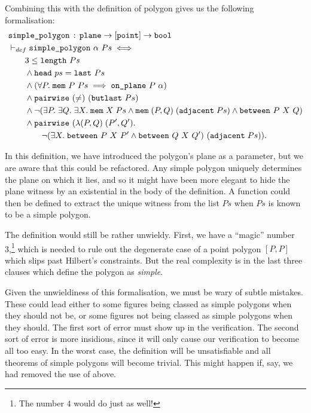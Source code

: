 Combining this with the definition of polygon gives us the following formalisation:
\begin{equation}\label{eq:SimplePolygonDef}
  \begin{split}
  &\texttt{simple\_polygon}\,:\,\texttt{plane} \rightarrow [\texttt{point}] \rightarrow \texttt{bool}\\
  &\vdash_{def}\texttt{simple\_polygon}\ \alpha\ Ps \iff \\
  &\qquad 3 \leq \texttt{length}\ Ps\\
  &\qquad\wedge \texttt{head}\ ps = \texttt{last}\ Ps\\
  &\qquad\wedge (\forall P.\;\texttt{mem}\ P\ Ps \implies \texttt{on\_plane}\ P\ \alpha)\\
  &\qquad\wedge \texttt{pairwise}\ (\neq)\ (\texttt{butlast}\ Ps)\\
  &\qquad\wedge \neg(\exists P.\;\exists Q.\;\exists X.\; \texttt{mem}\;X\;Ps\wedge\texttt{mem}\;(P,Q)\;(\texttt{adjacent}\;Ps)\wedge\texttt{between}\ P\ X\ Q)\\
  &\qquad\wedge \texttt{pairwise}\ (\lambda(P,Q)\;(P',Q').\\
  &\qquad\qquad\neg(\exists X.\;\texttt{between}\ P\ X\ P' \wedge \texttt{between}\ Q\ X\ Q')\ (\texttt{adjacent}\;Ps)).
  \end{split}
\end{equation}

In this definition, we have introduced the polygon's plane as a parameter, but we are aware that this could be refactored. Any simple polygon uniquely determines the plane on which it lies, and so it might have been more elegant to hide the plane witness by an existential in the body of the definition. A function could then be defined to extract the unique witness from the list $Ps$ when $Ps$ is known to be a simple polygon. 

The definition would still be rather unwieldy. First, we have a ``magic'' number 3,\footnote{The number $4$ would do just as well!} which is needed to rule out the degenerate case of a point polygon $[P,P]$ which slips past Hilbert's constraints. But the real complexity is in the last three clauses which define the polygon as \emph{simple}. 

Given the unwieldiness of this formalisation, we must be wary of subtle mistakes. These could lead either to some figures being classed as simple polygons when they should not be, or some figures not being classed as simple polygons when they should. The first sort of error must show up in the verification. The second sort of error is more insidious, since it will only cause our verification to become all too easy. In the worst case, the definition will be unsatisfiable and all theorems of simple polygons will become trivial. This might happen if, say, we had removed the use of  above.

